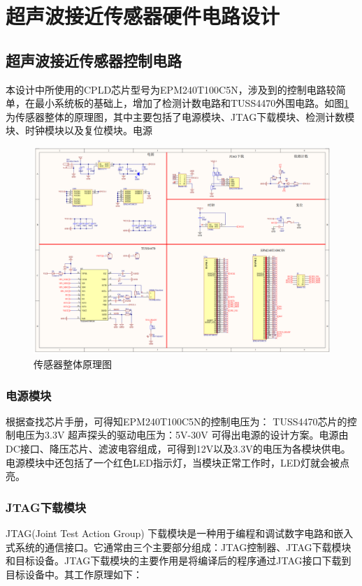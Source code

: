     \newpage
	\section{超声波接近传感器硬件电路设计}
	
    \subsection{超声波接近传感器控制电路}
    本设计中所使用的CPLD芯片型号为EPM240T100C5N，涉及到的控制电路较简单，在最小系统板的基础上，增加了检测计数电路和TUSS4470外围电路。如图\ref{传感器整体原理图}为传感器整体的原理图，其中主要包括了电源模块、JTAG下载模块、检测计数模块、时钟模块以及复位模块。电源
    \begin{figure}[ht]
        \centering
        \includegraphics[width=12cm]{figure/Overall circuit.png}
        \caption{传感器整体原理图}
        \label{传感器整体原理图}
    \end{figure}
    \subsubsection{电源模块}
      根据查找芯片手册，可得知EPM240T100C5N的控制电压为：
    TUSS4470芯片的控制电压为3.3V
    超声探头的驱动电压为：5V-30V
    可得出电源的设计方案。电源由DC接口、降压芯片、滤波电容组成，可得到12V以及3.3V的电压为各模块供电。电源模块中还包括了一个红色LED指示灯，当模块正常工作时，LED灯就会被点亮。
    
    \subsubsection{JTAG下载模块}
    JTAG(Joint Test Action Group) 下载模块是一种用于编程和调试数字电路和嵌入式系统的通信接口。它通常由三个主要部分组成：JTAG控制器、JTAG下载模块和目标设备。JTAG下载模块的主要作用是将编译后的程序通过JTAG接口下载到目标设备中。其工作原理如下：
    
